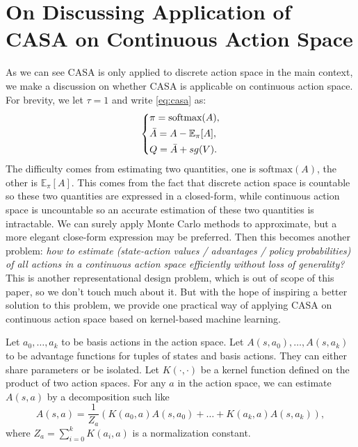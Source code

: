 \clearpage

{ \section{On Discussing Application of CASA on Continuous Action Space}
\label{app:cts_space}

As we can see CASA is only applied to discrete action space in the main context, we make a discussion on whether CASA is applicable on continuous action space. 
For brevity, we let $\tau=1$ and write \eqref{eq:casa} as:
\begin{equation}
\left\{
    \begin{aligned}
        &\pi = \text{softmax}(A), \\
        &\Bar{A} = A - \mathbb{E}_{\pi} [A], \\
        &Q = \Bar{A} + sg(V).
    \end{aligned}
\right. 
\end{equation}
The difficulty comes from estimating two quantities, one is $\text{softmax}(A)$, the other is $\mathbb{E}_{\pi} [A]$. 
This comes from the fact that discrete action space is countable so these two quantities are expressed in a closed-form, while continuous action space is uncountable so an accurate estimation of these two quantities is intractable. 
We can surely apply Monte Carlo methods to approximate, but a more elegant close-form expression may be preferred. 
Then this becomes another problem: \textit{how to estimate (state-action values / advantages / policy probabilities) of all actions in a continuous action space efficiently without loss of generality?}
This is another representational design problem, which is out of scope of this paper, so we don't touch much about it. 
But with the hope of inspiring a better solution to this problem, we provide one practical way of applying CASA on continuous action space based on kernel-based machine learning. 

Let $a_0, \dots, a_k$ to be basis actions in the action space. 
Let $A(s, a_0), \dots, A(s, a_k)$ to be advantage functions for tuples of states and basis actions. 
They can either share parameters or be isolated. 
Let $K(\cdot, \cdot)$ be a kernel function defined on the product of two action spaces. 
For any $a$ in the action space, we can estimate $A(s, a)$ by a decomposition such like $$A(s, a) = \frac{1}{Z_a} (K(a_0, a) A(s, a_0) + \dots + K(a_k, a) A(s, a_k)),$$ where $Z_a = \sum_{i=0}^k K(a_i, a)$ is a normalization constant. 

}
